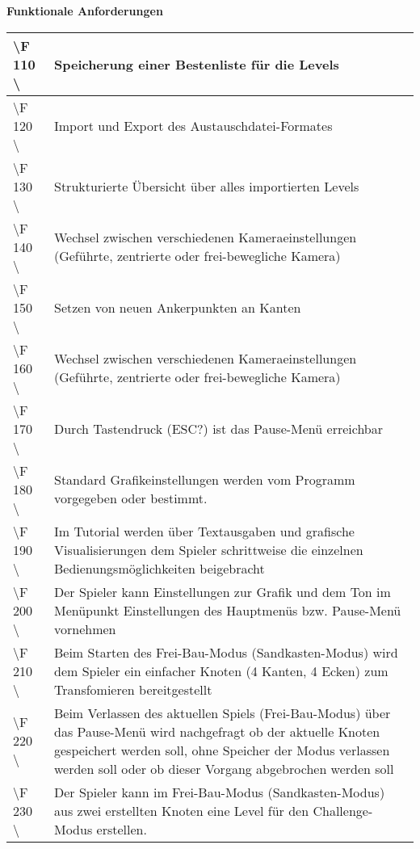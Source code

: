 \documentclass[10pt]{article}
\begin{document}
\textbf{Funktionale Anforderungen}\\
\begin{tabular}{|p{}|p{}|}
\hline 
\textbackslash F 110  \textbackslash & Speicherung einer Bestenliste für die Levels \\ 
\hline 
\textbackslash F 120  \textbackslash  & Import und Export des Austauschdatei-Formates \\ 
\hline 
\textbackslash F 130  \textbackslash  & Strukturierte Übersicht über alles importierten Levels \\ 
\hline
\textbackslash F 140  \textbackslash  & Wechsel zwischen verschiedenen Kameraeinstellungen (Geführte, zentrierte oder frei-bewegliche Kamera)  \\ 
\hline
\textbackslash F 150  \textbackslash  & Setzen von neuen Ankerpunkten an Kanten \\ 
\hline
\textbackslash F 160  \textbackslash  & Wechsel zwischen verschiedenen Kameraeinstellungen (Geführte, zentrierte oder frei-bewegliche Kamera)  \\ 
\hline
\textbackslash F 170  \textbackslash  & Durch Tastendruck (ESC?) ist das Pause-Menü erreichbar\\ 
\hline
\textbackslash F 180  \textbackslash  & Standard Grafikeinstellungen werden vom Programm vorgegeben oder bestimmt.\\ 
\hline
\textbackslash F 190  \textbackslash  & Im Tutorial werden über Textausgaben und grafische Visualisierungen dem Spieler schrittweise die einzelnen Bedienungsmöglichkeiten beigebracht  \\
\hline
\textbackslash F 200  \textbackslash  & Der Spieler kann Einstellungen zur Grafik und dem Ton im Menüpunkt Einstellungen des Hauptmenüs bzw. Pause-Menü vornehmen\\
\hline
\textbackslash F 210  \textbackslash  & Beim Starten des Frei-Bau-Modus (Sandkasten-Modus) wird dem Spieler ein einfacher Knoten (4 Kanten, 4 Ecken) zum Transfomieren bereitgestellt \\
\hline
\textbackslash F 220  \textbackslash  & Beim Verlassen des aktuellen Spiels (Frei-Bau-Modus) über das Pause-Menü wird nachgefragt ob der aktuelle Knoten gespeichert werden soll, ohne Speicher der Modus verlassen werden soll oder ob dieser Vorgang abgebrochen werden soll\\
\hline
\textbackslash F 230  \textbackslash  & Der Spieler kann im Frei-Bau-Modus (Sandkasten-Modus) aus zwei erstellten Knoten eine Level für den Challenge-Modus erstellen.\\

\end{tabular}
\end{document}
